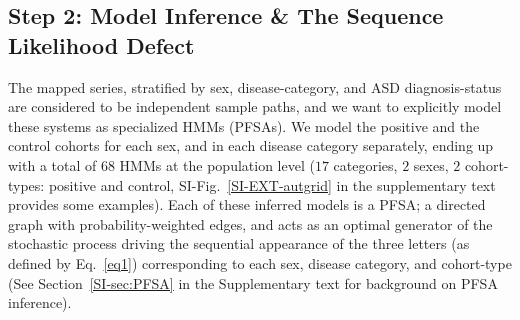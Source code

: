 \documentclass[3p,super,numbers,sort&compress,preprint,10pt]{elsarticle}
\gdef\treatment{positive\xspace}
\begin{document}
\subsection{Step 2: Model Inference \& The Sequence Likelihood Defect}
The mapped series, stratified by  sex, disease-category, and ASD diagnosis-status are considered to be independent sample paths, and we want to explicitly model these systems as specialized HMMs (PFSAs). We model the \treatment and the control cohorts for each sex, and in  each disease category separately, ending up with a total of $68$ HMMs at the population level ($17$ categories, $2$ sexes, $2$ cohort-types: \treatment and control, SI-Fig.~\ref{SI-EXT-autgrid} in the supplementary text provides some examples). Each of these inferred models is  a PFSA;  a directed graph with probability-weighted edges, and acts as an optimal generator of the  stochastic process driving the  sequential appearance of the three letters (as defined by Eq.~\eqref{eq1})  corresponding to each sex, disease category, and cohort-type (See Section~\ref{SI-sec:PFSA} in the Supplementary text for  background on PFSA inference). 
\end{document}
